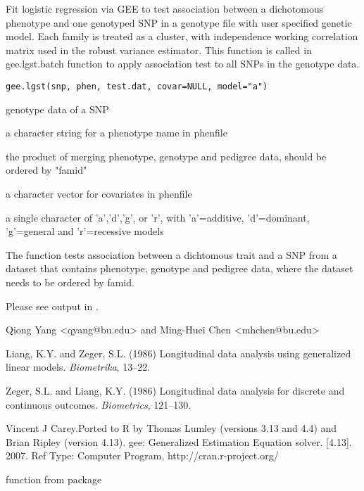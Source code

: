 \begin{Description}\relax
Fit logistic regression via GEE to test association between a dichotomous phenotype 
and one genotyped SNP in a genotype file with user specified genetic model. Each family is treated as 
a cluster, with independence working correlation matrix used in the robust variance estimator.
This function is called in gee.lgst.batch function to apply association test to all SNPs in the 
genotype data.
\end{Description}
\begin{Usage}
\begin{verbatim}
gee.lgst(snp, phen, test.dat, covar=NULL, model="a")
\end{verbatim}
\end{Usage}
\begin{Arguments}
\begin{ldescription}
\item[\code{snp}] genotype data of a SNP 
\item[\code{phen}] a character string for a phenotype name in phenfile 
\item[\code{test.dat}] the product of merging phenotype, genotype and pedigree data, should be ordered by "famid" 
\item[\code{covar}] a character vector for covariates in phenfile 
\item[\code{model}] a single character of 'a','d','g', or 'r', with 'a'=additive, 'd'=dominant, 'g'=general and 'r'=recessive models 
\end{ldescription}
\end{Arguments}
\begin{Details}\relax
The  function tests association between a dichtomous trait and a SNP from a dataset that contains phenotype, genotype and 
pedigree data, where the dataset needs to be ordered by famid.
\end{Details}
\begin{Value}
Please see output in .
\end{Value}
\begin{Author}\relax
Qiong Yang <qyang@bu.edu> and Ming-Huei Chen <mhchen@bu.edu>
\end{Author}
\begin{References}\relax
Liang, K.Y. and Zeger, S.L. (1986)
Longitudinal data analysis using generalized linear models.
\emph{Biometrika},  13--22. 

Zeger, S.L. and Liang, K.Y. (1986)
Longitudinal data analysis for discrete and continuous outcomes.
\emph{Biometrics},  121--130.

Vincent J Carey.Ported to R by Thomas Lumley (versions 3.13 and 4.4) and Brian Ripley (version 4.13). gee: Generalized Estimation Equation solver. 
[4.13]. 2007. Ref Type: Computer Program, http://cran.r-project.org/
\end{References}
\begin{SeeAlso}\relax
{} function from package 
\end{SeeAlso}

